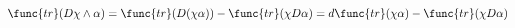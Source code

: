 \begin{equation}
\func{tr}(D\chi \wedge \alpha )=\func{tr}(D(\chi
\alpha))-\func{tr}(\chi D\alpha )=d\func{tr}(\chi \alpha
)-\func{tr}(\chi D\alpha )
\end{equation}

